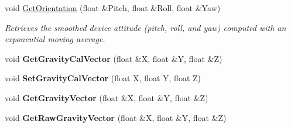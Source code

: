 \begin{DoxyCompactItemize}
\item 
void \hyperlink{class_c_accelerometer_ae332fb3f201d67f554328fadaa343fe0}{\-Get\-Orientation} (float \&\-Pitch, float \&\-Roll, float \&\-Yaw)
\begin{DoxyCompactList}\small\item\em \-Retrieves the smoothed device attitude (pitch, roll, and yaw) computed with an exponential moving average. \end{DoxyCompactList}\item 
\hypertarget{class_c_accelerometer_a8813b02e69b3072f4190b9779954b79d}{void {\bfseries \-Get\-Gravity\-Cal\-Vector} (float \&\-X, float \&\-Y, float \&\-Z)}\label{class_c_accelerometer_a8813b02e69b3072f4190b9779954b79d}

\item 
\hypertarget{class_c_accelerometer_afa6961a116ebc581da421b17b3976e92}{void {\bfseries \-Set\-Gravity\-Cal\-Vector} (float \-X, float \-Y, float \-Z)}\label{class_c_accelerometer_afa6961a116ebc581da421b17b3976e92}

\item 
\hypertarget{class_c_accelerometer_ad2b57ead77ae9d6abe9d28b070e0f891}{void {\bfseries \-Get\-Gravity\-Vector} (float \&\-X, float \&\-Y, float \&\-Z)}\label{class_c_accelerometer_ad2b57ead77ae9d6abe9d28b070e0f891}

\item 
\hypertarget{class_c_accelerometer_af318f42e0e26b5122eb3a1d82919baa4}{void {\bfseries \-Get\-Raw\-Gravity\-Vector} (float \&\-X, float \&\-Y, float \&\-Z)}\label{class_c_accelerometer_af318f42e0e26b5122eb3a1d82919baa4}

\end{DoxyCompactItemize}
